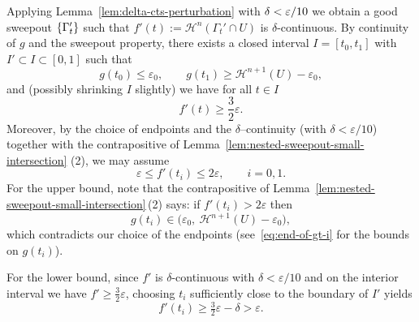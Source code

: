 Applying Lemma~\ref{lem:delta-cts-perturbation} with $\delta<\varepsilon/10$ we obtain a good sweepout
$\left\{\Gamma_t'\right\}$ such that $f'(t):=\mathcal{H}^{n}(\Gamma_t'\cap U)$ is $\delta$-continuous. 
By continuity of $g$ and the sweepout property, there exists a closed interval $I=[t_0,t_1]$ with $I'\subset I\subset[0,1]$ such that
\begin{equation}\label{eq:end-of-gt-i}
  g(t_0)\le \varepsilon_0,\qquad g(t_1)\ge \mathcal{H}^{n+1}(U)-\varepsilon_0,
\end{equation}
and (possibly shrinking $I$ slightly) we have for all $t\in I$
\begin{equation*}
  f'(t) \ge \frac{3}{2}\varepsilon.
\end{equation*}
Moreover, by the choice of endpoints and the $\delta$–continuity (with $\delta<\varepsilon/10$) together with the contrapositive of Lemma~\ref{lem:nested-sweepout-small-intersection} (2), we may assume
\begin{equation*}
  \varepsilon \le f'(t_i) \le 2\varepsilon, \qquad i=0,1.
\end{equation*}
For the upper bound, note that the contrapositive of Lemma~\ref{lem:nested-sweepout-small-intersection}\,(2) says:
if $f'(t_i)>2\varepsilon$ then 
\begin{equation*}
    g(t_i)\in\bigl(\varepsilon_0,\ \mathcal{H}^{n+1}(U)-\varepsilon_0),
\end{equation*}
which contradicts our choice of the endpoints (see~\eqref{eq:end-of-gt-i} for the bounds on $g(t_i)$).

For the lower bound, since $f'$ is $\delta$-continuous with $\delta<\varepsilon/10$ and
on the interior interval we have $f'\ge \tfrac{3}{2}\varepsilon$, choosing $t_i$ sufficiently close to the boundary of $I'$ yields
\begin{equation*}
    f'(t_i) \ge \tfrac{3}{2}\varepsilon-\delta > \varepsilon.
\end{equation*}

